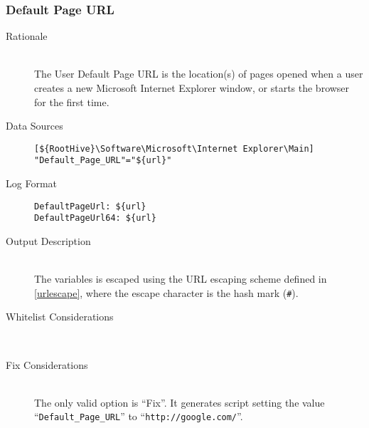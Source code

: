 \subsubsection{Default Page URL}
\begin{description}
\item[Rationale] \hfill \\
The User Default Page URL is the location(s) of pages opened when a user creates
a new Microsoft Internet Explorer window, or starts the browser for the first
time. 

\item[Data Sources] \hfill
\vspace{-\baselineskip}
\begin{verbatim}
[${RootHive}\Software\Microsoft\Internet Explorer\Main]
"Default_Page_URL"="${url}"
\end{verbatim}
\item[Log Format] \hfill
\vspace{-\baselineskip}
\begin{verbatim} 
DefaultPageUrl: ${url}
DefaultPageUrl64: ${url}
\end{verbatim}
\item[Output Description] \hfill \\
The variables  is escaped using the URL escaping
scheme defined in \ref{urlescape}, where the escape character is the hash mark
(\verb|#|).
\item[Whitelist Considerations] \hfill \\

\item[Fix Considerations] \hfill \\
The only valid option is ``Fix''. It generates script setting the value
``\verb|Default_Page_URL|'' to ``\verb|http://google.com/|''.
\end{description}

